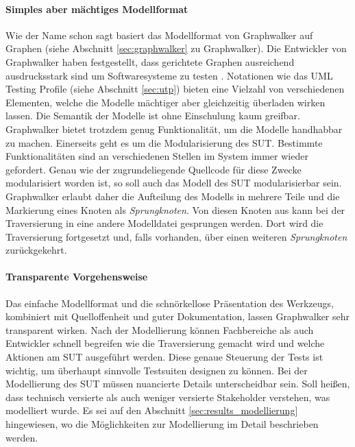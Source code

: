 \paragraph{Simples aber mächtiges Modellformat} Wie der Name schon sagt basiert das Modellformat von Graphwalker auf Graphen (siehe Abschnitt \ref{sec:graphwalker} zu Graphwalker). Die Entwickler von Graphwalker haben festgestellt, dass gerichtete Graphen ausreichend ausdrucksstark sind um Softwaresysteme zu testen \cite{_graphwalker_2015}. Notationen wie das UML Testing Profile (siehe Abschnitt \ref{sec:utp}) bieten eine Vielzahl von verschiedenen Elementen, welche die Modelle mächtiger aber gleichzeitig überladen wirken lassen. Die Semantik der Modelle ist ohne Einschulung kaum greifbar.\\
Graphwalker bietet trotzdem genug Funktionalität, um die Modelle handhabbar zu machen. Einerseits geht es um die Modularisierung des \Gls{SUT}. Bestimmte Funktionalitäten sind an verschiedenen Stellen im System immer wieder gefordert. Genau wie der zugrundeliegende Quellcode für diese Zwecke modularisiert worden ist, so soll auch das Modell des \Gls{SUT} modularisierbar sein. Graphwalker erlaubt daher die Aufteilung des Modells in mehrere Teile und die Markierung eines Knoten als \textit{Sprungknoten}. Von diesen Knoten aus kann bei der Traversierung in eine andere Modelldatei gesprungen werden. Dort wird die Traversierung fortgesetzt und, falls vorhanden, über einen weiteren \textit{Sprungknoten} zurückgekehrt.

\paragraph{Transparente Vorgehensweise} Das einfache Modellformat und die schnörkellose Präsentation des Werkzeugs, kombiniert mit Quelloffenheit und guter Dokumentation, lassen Graphwalker sehr transparent wirken. Nach der Modellierung können Fachbereiche als auch Entwickler schnell begreifen wie die Traversierung gemacht wird und welche Aktionen am \Gls{SUT} ausgeführt werden. Diese genaue Steuerung der Tests ist wichtig, um überhaupt sinnvolle Testsuiten designen zu können. Bei der Modellierung des \Gls{SUT} müssen nuancierte Details unterscheidbar sein. Soll heißen, dass technisch versierte als auch weniger versierte Stakeholder verstehen, was modelliert wurde. Es sei auf den Abschnitt \ref{sec:results_modellierung} hingewiesen, wo die Möglichkeiten zur Modellierung im Detail beschrieben werden.


